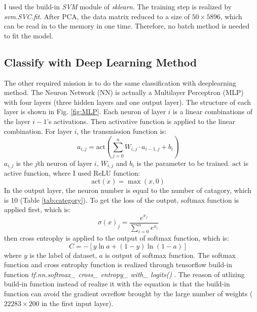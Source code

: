 \documentclass[sigchi]{acmart}
\begin{document}
I used the build-in \textit{SVM} module of \textit{sklearn}. The training step is realized by \textit{svm.SVC.fit}. After PCA, the data matrix reduced to a size of $50\times5896$, which can be read in to the memory in one time. Therefore, no batch method is needed to fit the model.

\subsection{Classify with Deep Learning Method}

The other required mission is to do the same classification with deeplearning method. The Neuron Network (NN) is actually a Multilayer Perceptron (MLP) with four layers (three hidden layers and one output layer). The structure of each layer is shown in Fig. \ref{fig:MLP}. Each neuron of layer $i$ is a linear combinations of the layer $i-1$'s activations. Then activative function is applied to the linear combination. For layer $i$, the transmission function is:
\begin{equation}
  a_{i,j} = \mathrm{act} \left(\sum_{j=0}^n {W_{i,j} \cdot a_{i-1, j} + b_i}\right)
\end{equation}
$a_{i, j}$ is the $j$th neuron of layer $i$, $W_{i, j}$ and $b_i$ is the parameter to be trained. $\mathrm{act}$ is active function, where I used ReLU function:
\begin{equation}
  \mathrm{act}\left(x\right)=\max \left(x, 0\right)
\end{equation}
In the output layer, the neuron number is equal to the number of catagory, which is 10 (Table \ref{tab:category}). To get the loss of the output, softmax function is applied first, which is:
\begin{equation}
  \sigma\left(x\right)_j = \dfrac{e^{x_j}}{\sum_{i=0}^n {e^{x_i}}}
\end{equation}
then cross entrophy is applied to the output of softmax function, which is:
\begin{equation}
  C = - \left[y\ln a + \left(1-y\right)\ln\left(1-a\right)\right]
\end{equation}
where $y$ is the label of dataset, $a$ is output of softmax function. The softmax function and cross entrophy function is realized through tensorflow build-in function \textit{tf.nn.softmax\_ cross\_ entropy\_ with\_ logits()} \cite{tensorflow.org}. The reason of utlizing build-in function instead of realize it with the equation is that the build-in function can avoid the gradient ovreflow brought by the large number of weights ( $22283\times200$ in the first input layer).
\end{document}
